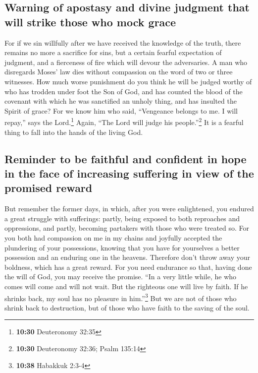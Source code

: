 \hypertarget{warning-of-apostasy-and-divine-judgment-that-will-strike-those-who-mock-grace}{%
\subsection{Warning of apostasy and divine judgment that will strike
those who mock
grace}\label{warning-of-apostasy-and-divine-judgment-that-will-strike-those-who-mock-grace}}

 For if we sin willfully after we have received the
knowledge of the truth, there remains no more a sacrifice for sins,
 but a certain fearful expectation of judgment, and a
fierceness of fire which will devour the adversaries.  A
man who disregards Moses' law dies without compassion on the word of two
or three witnesses.  How much worse punishment do you
think he will be judged worthy of who has trodden under foot the Son of
God, and has counted the blood of the covenant with which he was
sanctified an unholy thing, and has insulted the Spirit of grace?
 For we know him who said, ``Vengeance belongs to me. I
will repay,'' says the Lord.\footnote{\textbf{10:30} Deuteronomy 32:35}
Again, ``The Lord will judge his people.''\footnote{\textbf{10:30}
  Deuteronomy 32:36; Psalm 135:14}  It is a fearful thing
to fall into the hands of the living God.

\hypertarget{reminder-to-be-faithful-and-confident-in-hope-in-the-face-of-increasing-suffering-in-view-of-the-promised-reward}{%
\subsection{Reminder to be faithful and confident in hope in the face of
increasing suffering in view of the promised
reward}\label{reminder-to-be-faithful-and-confident-in-hope-in-the-face-of-increasing-suffering-in-view-of-the-promised-reward}}

 But remember the former days, in which, after you were
enlightened, you endured a great struggle with sufferings:
 partly, being exposed to both reproaches and
oppressions, and partly, becoming partakers with those who were treated
so.  For you both had compassion on me in my chains and
joyfully accepted the plundering of your possessions, knowing that you
have for yourselves a better possession and an enduring one in the
heavens.  Therefore don't throw away your boldness, which
has a great reward.  For you need endurance so that,
having done the will of God, you may receive the promise.
 ``In a very little while, he who comes will come and
will not wait.  But the righteous one will live by faith.
If he shrinks back, my soul has no pleasure in him.''\footnote{\textbf{10:38}
  Habakkuk 2:3-4}  But we are not of those who shrink
back to destruction, but of those who have faith to the saving of the
soul.

